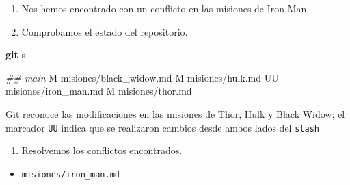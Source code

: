 \documentclass[
]{book}
\newenvironment{Shaded}{\begin{snugshade}}{\end{snugshade}}
\newcommand{\CommentTok}[1]{\textcolor[rgb]{0.56,0.35,0.01}{\textit{#1}}}
\newcommand{\ExtensionTok}[1]{#1}
\newcommand{\FunctionTok}[1]{\textcolor[rgb]{0.13,0.29,0.53}{\textbf{#1}}}
\newcommand{\NormalTok}[1]{#1}
\providecommand{\tightlist}{%
  \setlength{\itemsep}{0pt}\setlength{\parskip}{0pt}}
\begin{document}
\begin{enumerate}
\def\labelenumi{\arabic{enumi}.}
\setcounter{enumi}{6}
\item
  Nos hemos encontrado con un conflicto en las misiones de Iron Man.
\item
  Comprobamos el estado del repositorio.
\end{enumerate}

\begin{Shaded}
\begin{Highlighting}[]
\FunctionTok{git}\NormalTok{ s}
\end{Highlighting}
\end{Shaded}

\begin{Shaded}
\begin{Highlighting}[]
\CommentTok{\#\# main}
\ExtensionTok{M}\NormalTok{  misiones/black\_widow.md}
\ExtensionTok{M}\NormalTok{  misiones/hulk.md}
\ExtensionTok{UU}\NormalTok{ misiones/iron\_man.md}
\ExtensionTok{M}\NormalTok{  misiones/thor.md}
\end{Highlighting}
\end{Shaded}

Git reconoce las modificaciones en las misiones de Thor, Hulk y Black Widow; el marcador \texttt{UU} indica que se realizaron cambios desde ambos lados del \texttt{stash}

\begin{enumerate}
\def\labelenumi{\arabic{enumi}.}
\setcounter{enumi}{8}
\tightlist
\item
  Resolvemos los conflictos encontrados.
\end{enumerate}

\begin{itemize}
\tightlist
\item
  \texttt{misiones/iron\_man.md}
\end{itemize}
\end{document}
